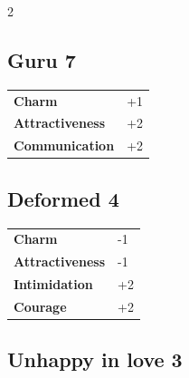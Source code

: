 \begin{multicols}{2}
\begin{tcolorbox}

\end{tcolorbox}

\begin{tcolorbox}
    \subsection*{Guru \hfill \small{7 }}
    \tcblower




\begin{tabular}{@{}ll@{}}
    \textbf{Charm} & +1\\
    \textbf{Attractiveness} & +2\\
    \textbf{Communication} & +2\\
\end{tabular}


\end{tcolorbox}

\begin{tcolorbox}
    \subsection*{Deformed \hfill \small{4 }}
    \tcblower




\begin{tabular}{@{}ll@{}}
    \textbf{Charm} & -1\\
    \textbf{Attractiveness} & -1\\
    \textbf{Intimidation} & +2\\
    \textbf{Courage} & +2\\
\end{tabular}


\end{tcolorbox}

\begin{tcolorbox}
    \subsection*{Unhappy in love \hfill \small{3 }}
    \tcblower





\end{tcolorbox}
\end{multicols}
